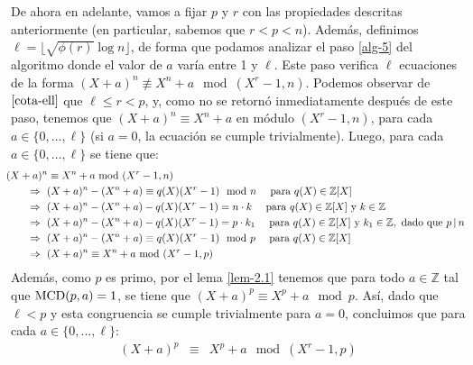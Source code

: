 \documentclass[10pt]{article}
\newcommand{\0}{\mathbf{0}}
\newcommand{\1}{\mathbf{1}}
\newcommand{\divi}{\hspace{1.8pt}|\hspace{1.8pt}}
\newcommand{\modulo}{\mod(X^r-1,n)}
\newcommand{\modulop}{\mod (X^r-1,p)}
\newcommand{\modulos}{\!\!\mod(X^r-1,n)}
\newcommand{\modulops}{\!\!\mod (X^r-1,p)}
\newcommand{\modl}{\mod}
\newcommand{\MCD}{{\rm MCD}}
\newcommand{\+}{\oplus}
\newcommand{\comentario}[1]{}
\newcommand{\comentarioin}[1]{}
\theoremstyle{remark}
\theoremstyle{remark}
\begin{document}
                De ahora en adelante, vamos a fijar $p$ y $r$ con las propiedades descritas anteriormente (en particular, sabemos que $r < p < n$). Además, definimos $\ell=\lfloor \sqrt{\phi(r)}\log  n\rfloor$, de forma que podamos analizar el paso \ref{alg-5} del algoritmo donde el valor de $a$ varía entre 1 y $\ell$. Este paso 
	verifica $\ell$ ecuaciones de la forma $(X+a)^n \not\equiv X^n+a \modulo$.
	Podemos observar de $\eqref{cota-ell}$ que $\ell \leq r < p$, y, como no se retornó inmediatamente después de este paso, tenemos que $(X+a)^n\equiv X^n+a$ en módulo $(X^r -1,n)$, para  cada $a \in \{0, \ldots, \ell\}$ (si $a=0$, la ecuación se cumple trivialmente). Luego, para cada $a \in \{0, \ldots, \ell\}$ se tiene que:
	\begin{align}
		&\hspace{-5pt}(X+a)^n\equiv X^n+a \modulos \nonumber\\
&\hspace{15pt}\Rightarrow\ (X+a)^n - (X^n+a) \equiv q(X)(X^r-1) \mod n \quad \text{ para } q(X)\in \mathbb{Z}[X]  \nonumber\\ 
&\hspace{15pt}\Rightarrow\ (X+a)^n - (X^n+a) -q(X)(X^r-1)= n\cdot k \quad \text{ para } q(X)\in \mathbb{Z}[X]  \text{ y } k \in \mathbb{Z} \nonumber\\
&\hspace{15pt}\Rightarrow\ (X+a)^n - (X^n+a) -q(X)(X^r-1)= p\cdot k_1 \quad \text{ para } q(X)\in \mathbb{Z}[X]  \text{ y } k_1 \in \mathbb{Z}, \text{ dado que } p \divi n \nonumber\\
&\hspace{15pt}\Rightarrow\ (X+a)^n - (X^n+a) \equiv q(X)(X^r-1) \mod p \quad \text{ para } q(X)\in \mathbb{Z}[X]  \nonumber\\ 
&\hspace{15pt}\Rightarrow\ (X+a)^n\equiv X^n+a \modulops \label{eq:7}
\end{align}
	Además, como $p$ es primo, 
	por el lema \ref{lem-2.1} tenemos que para todo $a \in \mathbb{Z}$ tal que $\MCD(p,a)=1$, se tiene que $(X+a)^p \equiv X^p+a \mod p$. Así, dado que $\ell < p$ y esta congruencia se cumple trivialmente para $a = 0$, concluimos que para cada $a \in \{0, \ldots, \ell\}$:
	\begin{eqnarray}
		(X+a)^p&\equiv & X^p+a \modulop \label{eq:8}		
	\end{eqnarray}
\end{document}
